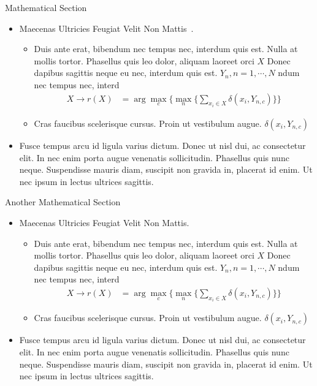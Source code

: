 \begin{block}{Mathematical Section}
	
	\begin{itemize}
		\item Maecenas Ultricies Feugiat Velit Non Mattis~\cite{combettes2014}.
		\begin{itemize}
			\item Duis ante erat, bibendum nec tempus nec, interdum quis est. Nulla at mollis tortor. Phasellus quis leo dolor, aliquam laoreet orci $X$ Donec dapibus sagittis neque eu nec, interdum quis est. $Y_n, n=1,\cdots,N$ ndum nec tempus nec, interd
			\begin{align*}
			X \rightarrow r(X) & = \arg \max_{c} \Big\{ \max_n \big\{ \sum_{x_i \in X} \delta(x_i,Y_{n,c})\big\} \Big\} 
			\end{align*}
			\item Cras faucibus scelerisque cursus. Proin ut vestibulum augue. $\delta(x_i,Y_{n,c})$
		\end{itemize}
		\item Fusce tempus arcu id ligula varius dictum. Donec ut nisl dui, ac consectetur elit. In nec enim porta augue venenatis sollicitudin. Phasellus quis nunc neque. Suspendisse mauris diam, suscipit non gravida in, placerat id enim. Ut nec ipsum in lectus ultrices sagittis.
	\end{itemize}
	
\end{block}


\begin{block}{Another Mathematical Section}
	
	\begin{itemize}
		\item Maecenas Ultricies Feugiat Velit Non Mattis.
		\begin{itemize}
			\item Duis ante erat, bibendum nec tempus nec, interdum quis est. Nulla at mollis tortor. Phasellus quis leo dolor, aliquam laoreet orci $X$ Donec dapibus sagittis neque eu nec, interdum quis est. $Y_n, n=1,\cdots,N$ ndum nec tempus nec, interd
			\begin{align*}
			X \rightarrow r(X) & = \arg \max_{c} \Big\{ \max_n \big\{ \sum_{x_i \in X} \delta(x_i,Y_{n,c})\big\} \Big\} 
			\end{align*}
			\item Cras faucibus scelerisque cursus. Proin ut vestibulum augue. $\delta(x_i,Y_{n,c})$
		\end{itemize}
		\item Fusce tempus arcu id ligula varius dictum. Donec ut nisl dui, ac consectetur elit. In nec enim porta augue venenatis sollicitudin. Phasellus quis nunc neque. Suspendisse mauris diam, suscipit non gravida in, placerat id enim. Ut nec ipsum in lectus ultrices sagittis.
	\end{itemize}
	
\end{block}


